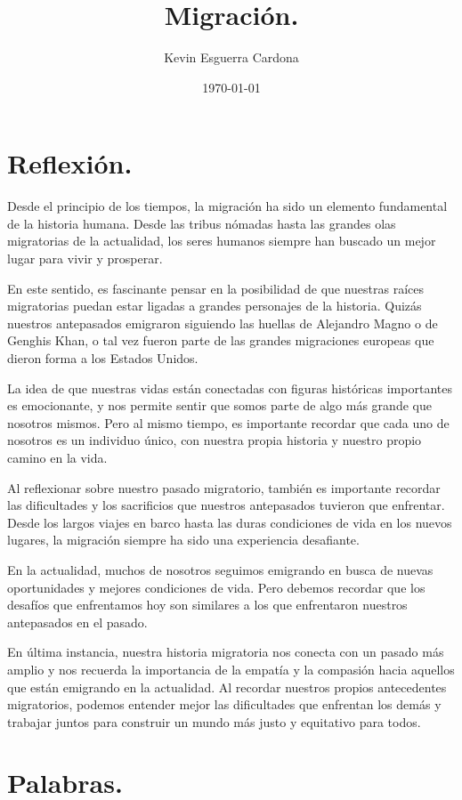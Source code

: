 \documentclass{article}
\title{Migración.}
\author{Kevin Esguerra Cardona}
\date{\today}
\begin{document}
\maketitle

\section*{Reflexión.}

Desde el principio de los tiempos, la migración ha sido un elemento fundamental de la historia humana. Desde las tribus nómadas hasta las grandes olas migratorias de la actualidad, los seres humanos siempre han buscado un mejor lugar para vivir y prosperar.

En este sentido, es fascinante pensar en la posibilidad de que nuestras raíces migratorias puedan estar ligadas a grandes personajes de la historia. Quizás nuestros antepasados emigraron siguiendo las huellas de Alejandro Magno o de Genghis Khan, o tal vez fueron parte de las grandes migraciones europeas que dieron forma a los Estados Unidos.

La idea de que nuestras vidas están conectadas con figuras históricas importantes es emocionante, y nos permite sentir que somos parte de algo más grande que nosotros mismos. Pero al mismo tiempo, es importante recordar que cada uno de nosotros es un individuo único, con nuestra propia historia y nuestro propio camino en la vida.

Al reflexionar sobre nuestro pasado migratorio, también es importante recordar las dificultades y los sacrificios que nuestros antepasados tuvieron que enfrentar. Desde los largos viajes en barco hasta las duras condiciones de vida en los nuevos lugares, la migración siempre ha sido una experiencia desafiante.

En la actualidad, muchos de nosotros seguimos emigrando en busca de nuevas oportunidades y mejores condiciones de vida. Pero debemos recordar que los desafíos que enfrentamos hoy son similares a los que enfrentaron nuestros antepasados en el pasado.

En última instancia, nuestra historia migratoria nos conecta con un pasado más amplio y nos recuerda la importancia de la empatía y la compasión hacia aquellos que están emigrando en la actualidad. Al recordar nuestros propios antecedentes migratorios, podemos entender mejor las dificultades que enfrentan los demás y trabajar juntos para construir un mundo más justo y equitativo para todos.

\newpage
\section*{Palabras.}
\end{document}
